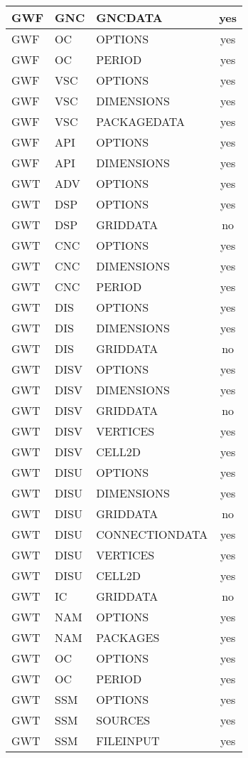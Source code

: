 \begin{longtable}{p{1.5cm} p{1.5cm} p{3cm} c}
GWF & GNC & GNCDATA & yes \\ 
\hline
GWF & OC & OPTIONS & yes \\ 
GWF & OC & PERIOD & yes \\ 
\hline
GWF & VSC & OPTIONS & yes \\ 
GWF & VSC & DIMENSIONS & yes \\ 
GWF & VSC & PACKAGEDATA & yes \\ 
\hline
GWF & API & OPTIONS & yes \\ 
GWF & API & DIMENSIONS & yes \\ 
\hline
GWT & ADV & OPTIONS & yes \\ 
\hline
GWT & DSP & OPTIONS & yes \\ 
GWT & DSP & GRIDDATA & no \\ 
\hline
GWT & CNC & OPTIONS & yes \\ 
GWT & CNC & DIMENSIONS & yes \\ 
GWT & CNC & PERIOD & yes \\ 
\hline
GWT & DIS & OPTIONS & yes \\ 
GWT & DIS & DIMENSIONS & yes \\ 
GWT & DIS & GRIDDATA & no \\ 
\hline
GWT & DISV & OPTIONS & yes \\ 
GWT & DISV & DIMENSIONS & yes \\ 
GWT & DISV & GRIDDATA & no \\ 
GWT & DISV & VERTICES & yes \\ 
GWT & DISV & CELL2D & yes \\ 
\hline
GWT & DISU & OPTIONS & yes \\ 
GWT & DISU & DIMENSIONS & yes \\ 
GWT & DISU & GRIDDATA & no \\ 
GWT & DISU & CONNECTIONDATA & yes \\ 
GWT & DISU & VERTICES & yes \\ 
GWT & DISU & CELL2D & yes \\ 
\hline
GWT & IC & GRIDDATA & no \\ 
\hline
GWT & NAM & OPTIONS & yes \\ 
GWT & NAM & PACKAGES & yes \\ 
\hline
GWT & OC & OPTIONS & yes \\ 
GWT & OC & PERIOD & yes \\ 
\hline
GWT & SSM & OPTIONS & yes \\ 
GWT & SSM & SOURCES & yes \\ 
GWT & SSM & FILEINPUT & yes \\ 

\end{longtable}
